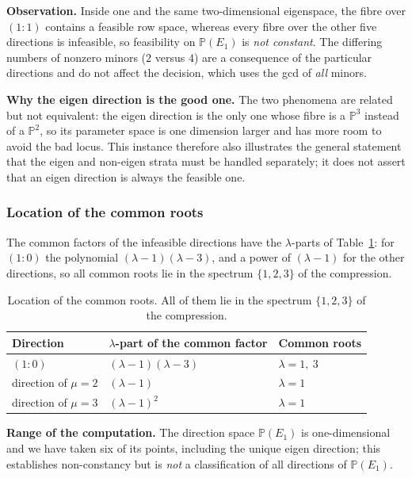 \documentclass[journal]{IEEEtran}
\theoremstyle{plainn}
\theoremstyle{remark}
\begin{document}
\textbf{Observation.} Inside one and the same two-dimensional eigenspace, the fibre over $(1\!:\!1)$
contains a feasible row space, whereas every fibre over the other five directions is infeasible, so
feasibility on $\mathbb{P}(E_1)$ is \emph{not constant}. The differing numbers of nonzero minors ($2$
versus $4$) are a consequence of the particular directions and do not affect the decision, which uses
the gcd of \emph{all} minors.

\textbf{Why the eigen direction is the good one.} The two phenomena are related but not equivalent: the
eigen direction is the only one whose fibre is a $\mathbb{P}^{3}$ instead of a $\mathbb{P}^{2}$, so its
parameter space is one dimension larger and has more room to avoid the bad locus. This instance
therefore also illustrates the general statement that the eigen and non-eigen strata must be handled
separately; it does not assert that an eigen direction is always the feasible one.

\subsubsection{Location of the common roots}\label{sec6:sub:roots}

The common factors of the infeasible directions have the $\lambda$-parts of Table~\ref{sec6:tab:roots}:
for $(1\!:\!0)$ the polynomial $(\lambda-1)(\lambda-3)$, and a power of $(\lambda-1)$ for the other
directions, so all common roots lie in the spectrum $\{1,2,3\}$ of the compression.

\begin{table}[t]
\centering
\caption{Location of the common roots. All of them lie in the spectrum $\{1,2,3\}$ of the compression.}
\label{sec6:tab:roots}
\begin{tabular}{@{}lll@{}}
\toprule
Direction & $\lambda$-part of the common factor & Common roots\\
\midrule
$(1\!:\!0)$ & $(\lambda-1)(\lambda-3)$ & $\lambda=1,\ 3$\\
direction of $\mu=2$ & $(\lambda-1)$ & $\lambda=1$\\
direction of $\mu=3$ & $(\lambda-1)^{2}$ & $\lambda=1$\\
\bottomrule
\end{tabular}
\end{table}

\textbf{Range of the computation.} The direction space $\mathbb{P}(E_1)$ is one-dimensional and we
have taken six of its points, including the unique eigen direction; this establishes non-constancy but
is \emph{not} a classification of all directions of $\mathbb{P}(E_1)$.
\end{document}
